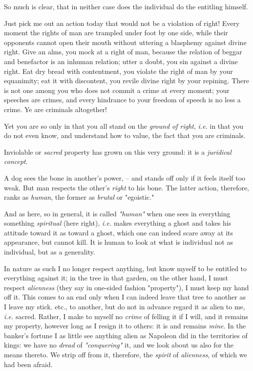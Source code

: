 So much is clear, that in neither case does the individual do the entitling 
himself.

Just pick me out an action today that would not be a violation of right! Every 
moment the rights of man are trampled under foot by one side, while their 
opponents cannot open their mouth without uttering a blasphemy against divine 
right. Give an alms, you mock at a right of man, because the relation of 
beggar and benefactor is an inhuman relation; utter a doubt, you sin against a 
divine right. Eat dry bread with contentment, you violate the right of man by 
your equanimity; eat it with discontent, you revile divine right by your 
repining. There is not one among you who does not commit a crime at every 
moment; your speeches are crimes, and every hindrance to your freedom of 
speech is no less a crime. Ye are criminals altogether!

Yet you are so only in that you all stand on the \textit{ground of right}, 
\textit{i.e.} in that you do not even know, and understand how to value, the 
fact that you are criminals.

Inviolable or \textit{sacred} property has grown on this very ground: it is a 
\textit{juridical concept}.

A dog sees the bone in another's power, -- and stands off only if it feels 
itself too weak. But man respects the other's \textit{right} to his bone. The 
latter action, therefore, ranks as \textit{human}, the former as 
\textit{brutal} or "{}egoistic."{}

And as here, so in general, it is called \textit{"{}human"{}} when one sees in 
everything something \textit{spiritual} (here right), \textit{i.e.} makes 
everything a ghost and takes his attitude toward it as toward a ghost, which 
one can indeed scare away at its appearance, but cannot kill. It is human to 
look at what is individual not as individual, but as a generality.

In nature as such I no longer respect anything, but know myself to be entitled 
to everything against it; in the tree in that garden, on the other hand, I 
must respect \textit{alienness} (they say in one-sided fashion 
"{}property"{}), I must keep my hand off it. This comes to an end only when I 
can indeed leave that tree to another as I leave my stick. etc., to another, 
but do not in advance regard it as alien to me, \textit{i.e.} sacred. Rather, 
I make to myself no \textit{crime} of felling it if I will, and it remains my 
property, however long as I resign it to others: it is and remains 
\textit{mine}. In the banker's fortune I as little see anything alien as 
Napoleon did in the territories of kings: we have no \textit{dread} of 
\textit{"{}conquering"{}} it, and we look about us also for the means thereto. 
We strip off from it, therefore, the \textit{spirit} of \textit{alienness}, of 
which we had been afraid.

